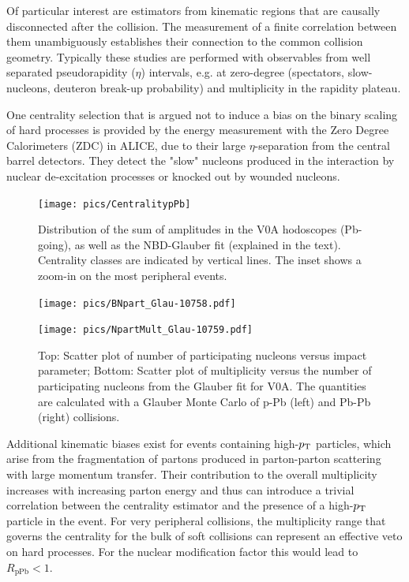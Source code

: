 Of particular interest are estimators from kinematic regions that are causally disconnected after the collision. The measurement of a finite correlation between them unambiguously establishes their connection to the common collision geometry. Typically these studies are performed with observables from well separated pseudorapidity ($\eta$) intervals, e.g. at zero-degree (spectators, slow-nucleons, deuteron break-up probability) and multiplicity in the rapidity plateau.

One centrality selection that is argued not to induce a bias on the binary scaling of hard processes is provided by the energy measurement with the Zero Degree Calorimeters (ZDC) in ALICE, due to their large $\eta$-separation from the central barrel detectors. They detect the "slow" nucleons produced in the interaction by nuclear de-excitation processes or knocked out by wounded nucleons.

\begin{figure}[b!]
\centering
            	\texttt{[image: pics/CentralitypPb]}
                \caption{Distribution of the sum of amplitudes in the V0A hodoscopes (Pb-going), as well
as the NBD-Glauber fit (explained in the text). Centrality classes are indicated by vertical lines. The
inset shows a zoom-in on the most peripheral events.~\cite{Adam:2014qja}}
	\label{fig:pPbcentrality}
\end{figure}



\begin{figure}[b!]
\centering
            	\texttt{[image: pics/BNpart\_Glau-10758.pdf]}

            	\texttt{[image: pics/NpartMult\_Glau-10759.pdf]}
                \caption{Top: Scatter plot of number of participating nucleons versus impact parameter; Bottom: Scatter plot of multiplicity versus the number of participating nucleons from the Glauber fit for V0A. The quantities are calculated with a Glauber Monte Carlo of p-Pb (left) and Pb-Pb (right) collisions.~\cite{Adam:2014qja}}
	\label{fig:pPbMult}
\end{figure}


Additional kinematic biases exist for events containing high-$p_{\rm T}$ particles, which arise from the fragmentation of partons produced in parton-parton scattering with large momentum transfer. Their contribution to the overall multiplicity increases with increasing parton energy and thus can introduce a trivial correlation between the centrality estimator and the presence of a high-$p_{\rm T}$ particle in the event. For very peripheral collisions, the multiplicity range that governs the centrality for the bulk of soft collisions can represent an effective veto on hard processes. For the nuclear modification factor this would lead to $R_\mathrm{pPb} < 1$.


